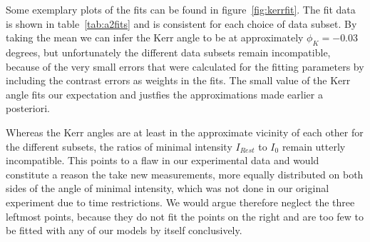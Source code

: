 \documentclass[a4paper,10pt]{scrartcl}
\begin{document}
Some exemplary plots of the fits can be found in figure~\ref{fig:kerrfit}.  The fit data is shown in table~\ref{tab:a2fits} and is consistent for each choice of data subset. By taking the mean we can infer the Kerr angle to be at approximately $\phi_K = -0.03\,$degrees, but unfortunately the different data subsets remain incompatible, because of the very small errors that were calculated for the fitting parameters by including the contrast errors as weights in the fits. The small value of the Kerr angle fits our expectation and justfies the approximations made earlier a posteriori.

Whereas the Kerr angles are at least in the approximate vicinity of each other for the different subsets, the ratios of minimal intensity $I_{Rest}$ to $I_0$ remain utterly incompatible. This points to a flaw in our experimental data and would constitute a reason the take new measurements, more equally distributed on both sides of the angle of minimal intensity, which was not done in our original experiment due to time restrictions. We would argue therefore neglect the three leftmost points, because they do not fit the points on the right and are too few to be fitted with any of our models by itself conclusively.
\end{document}
